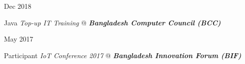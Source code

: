 \documentclass[a4paper,10pt]{article}
\newlength{\cvcolumngapwidth}
\newlength{\cvleftcolumnwidth}
\newlength{\cvrightcolumnwidth}
\newcommand{\cvsectionstyle}[1]{{\normalsize\cvsectionfont\textcolor{cvsectioncolor}{#1}}}
\newcommand{\cvtitlestyle}[1]{{\large\cvtitlefont\textcolor{cvtitlecolor}{#1}}}
\newcommand{\cvdurationstyle}[1]{{\small\cvdurationfont\textcolor{cvdurationcolor}{#1}}}
\newlength{\cvafteritemskipamount}
\newlength{\cvaftersectionskipamount}
\newlength{\cvbetweensectionandheadingextraskipamount}
\newlength{\cvparskip}
\newcommand{\cvsection}[1]{
    \begin{minipage}[t]{\cvleftcolumnwidth}
        \raggedleft\cvsectionstyle{#1}
    \end{minipage}%
    \hspace{\cvcolumngapwidth}%
    \begin{minipage}[t]{\cvrightcolumnwidth}
        \textcolor{cvrulecolor}{\rule{\cvrightcolumnwidth}{0.3mm}}
    \end{minipage}

    \vspace{\cvaftersectionskipamount}
}
\newcommand{\cvitem}[2]{
    \begin{minipage}[t]{\cvleftcolumnwidth}
        \raggedleft #1
    \end{minipage}%
    \hspace{\cvcolumngapwidth}%
    \begin{minipage}[t]{\cvrightcolumnwidth}
        \setlength{\parskip}{\cvparskip} #2
    \end{minipage}

    \vspace{\cvafteritemskipamount}
}
\newcommand{\cvhonoritem}[2]{
    \begin{minipage}[t]{\cvleftcolumnwidth}
        \raggedleft #1
    \end{minipage}%
    \hspace{\cvcolumngapwidth}%
    \begin{minipage}[t]{\cvrightcolumnwidth}
        \setlength{\parskip}{\cvparskip} #2
    \end{minipage}

    \vspace{1.7mm}
}
\begin{document}








\cvhonoritem{
    \cvdurationstyle{Dec 2018}
    }
{
    \cvtitlestyle{Java} \textcolor{cvwherecolor}{\textbf{\textbar}} \emph{Top-up IT Training} \cvdurationstyle{@} 
    \textcolor{cvwhatcolor}{\emph{\textbf{Bangladesh Computer Council (BCC)}}}
}


\cvitem{
    \cvdurationstyle{May 2017}
    }
{
    \cvtitlestyle{Participant} \textcolor{cvwherecolor}{\textbf{\textbar}} \emph{IoT Conference 2017} \cvdurationstyle{@}
    \textcolor{cvwhatcolor}{\emph{\textbf{{Bangladesh Innovation Forum (BIF)}}}}
}
\end{document}
